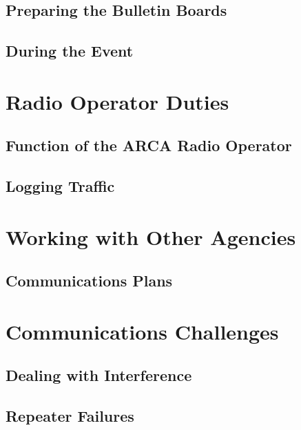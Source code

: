 \documentclass[pdflatex,letterpaper,twoside,12pt]{book}
\begin{document}
\subsection{Preparing the Bulletin Boards}

\subsection{During the Event}


\section{Radio Operator Duties}

\subsection{Function of the ARCA Radio Operator}

\subsection{Logging Traffic}

\section{Working with Other Agencies}

\subsection{Communications Plans}


\section{Communications Challenges}

\subsection{Dealing with Interference}

\subsection{Repeater Failures}
\end{document}
